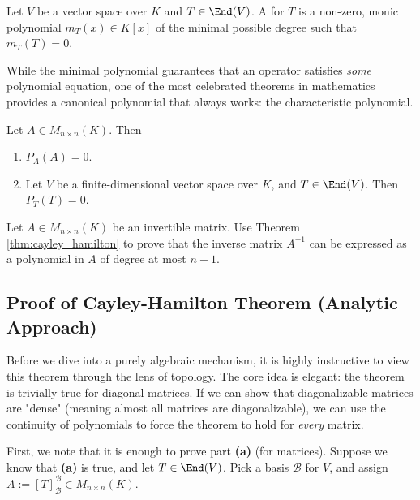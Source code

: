 \begin{definition}\label{def:minimal_poly}
  Let $V$ be a vector space over $K$ and $T \in \End(V)$. A  for $T$ is a non-zero, monic polynomial $m_T(x) \in K[x]$ of the minimal possible degree such that $m_T(T) = 0$.
\end{definition}

While the minimal polynomial guarantees that an operator satisfies \textit{some} polynomial equation, one of the most celebrated theorems in mathematics provides a canonical polynomial that always works: the characteristic polynomial.

\begin{theorem}\label{thm:cayley_hamilton}
  Let $A \in M_{n \times n}(K)$. Then
  \begin{enumerate}
    \item  $P_A(A) = 0$.
    \item Let $V$ be a finite-dimensional vector space over $K$, and $T \in \End(V)$. Then $P_T(T) = 0$.
  \end{enumerate}
\end{theorem}

\begin{exercise}\label{ex:cayley_inverse}
  Let $A \in M_{n \times n}(K)$ be an invertible matrix. Use Theorem \ref{thm:cayley_hamilton} to prove that the inverse matrix $A^{-1}$ can be expressed as a polynomial in $A$ of degree at most $n-1$.
\end{exercise}

\subsection*{Proof of Cayley-Hamilton Theorem (Analytic Approach)}

Before we dive into a purely algebraic mechanism, it is highly instructive to view this theorem through the lens of topology. The core idea is elegant: the theorem is trivially true for diagonal matrices. If we can show that diagonalizable matrices are "dense" (meaning almost all matrices are diagonalizable), we can use the continuity of polynomials to force the theorem to hold for \textit{every} matrix.

First, we note that it is enough to prove part \textbf{(a)} (for matrices). Suppose we know that \textbf{(a)} is true, and let $T \in \End(V)$. Pick a basis $\mathcal{B}$ for $V$, and assign $A := [T]_{\mathcal{B}}^{\mathcal{B}} \in M_{n \times n}(K)$.

